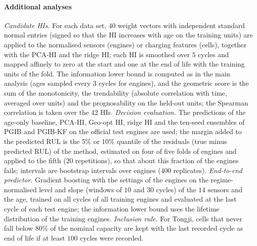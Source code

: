 \documentclass[preprint,12pt]{elsarticle}
\theoremstyle{definition}
\begin{document}
\paragraph{Additional analyses} \emph{Candidate HIs.} For each data set, $40$ weight vectors with independent standard normal entries (signed so that the HI increases with age on the training units) are applied to the normalised sensors (engines) or charging features (cells), together with the PCA-HI and the ridge HI; each HI is smoothed over $5$ cycles and mapped affinely to zero at the start and one at the end of life with the training units of the fold. The information lower bound is computed as in the main analysis (ages sampled every $3$ cycles for engines), and the geometric score is the sum of the monotonicity, the trendability (absolute correlation with time, averaged over units) and the prognosability on the held-out units; the Spearman correlation is taken over the $42$ HIs. \emph{Decision evaluation.} The predictions of the age-only baseline, PCA-HI, Geo-opt HI, ridge HI and the ten-seed ensembles of PGIB and PGIB-KF on the official test engines are used; the margin added to the predicted RUL is the $5\%$ or $10\%$ quantile of the residuals (true minus predicted RUL) of the method, estimated on four of five folds of engines and applied to the fifth ($20$ repetitions), so that about this fraction of the engines fails; intervals are bootstrap intervals over engines ($400$ replicates). \emph{End-to-end predictor.} Gradient boosting with the settings of the engines on the regime-normalised level and slope (windows of $10$ and $30$ cycles) of the $14$ sensors and the age, trained on all cycles of all training engines and evaluated at the last cycle of each test engine; the information lower bound uses the lifetime distribution of the training engines. \emph{Inclusion rule.} For Tongji, cells that never fall below $80\%$ of the nominal capacity are kept with the last recorded cycle as end of life if at least $100$ cycles were recorded.

\begin{table}[!t]
\caption{Tongji: main analysis (88 cells) and sensitivity to the inclusion rule (119 cells, cells that never reached the threshold counted as failed at their last recorded cycle).}
\label{tab:senstongji}
\centering\small
{}
\end{table}
\end{document}
